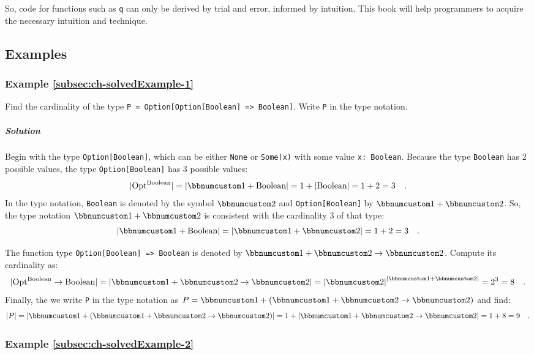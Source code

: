 So, code for functions such as \lstinline!q! can only be derived
by trial and error, informed by intuition. This book will help programmers
to acquire the necessary intuition and technique.

\subsection{Examples}

\subsubsection{Example \label{subsec:ch-solvedExample-1}\ref{subsec:ch-solvedExample-1}}

Find the cardinality of the type \lstinline!P = Option[Option[Boolean] => Boolean]!.
Write \lstinline!P! in the type notation.

\subparagraph{Solution}

Begin with the type \lstinline!Option[Boolean]!, which can be either
\lstinline!None! or \lstinline!Some(x)! with some value \lstinline!x: Boolean!.
Because the type \lstinline!Boolean! has $2$ possible values, the
type \lstinline!Option[Boolean]! has $3$ possible values:
\[
|\text{Opt}^{\text{Boolean}}|=\left|\bbnum 1+\text{Boolean}\right|=1+\left|\text{Boolean}\right|=1+2=3\quad.
\]
In the type notation, \lstinline!Boolean! is denoted by the symbol
$\bbnum 2$ and \lstinline!Option[Boolean]! by $\bbnum 1+\bbnum 2$.
So, the type notation $\bbnum 1+\bbnum 2$ is consistent with the
cardinality $3$ of that type:
\[
\left|\bbnum 1+\text{Boolean}\right|=\left|\bbnum 1+\bbnum 2\right|=1+2=3\quad.
\]

The function type \lstinline!Option[Boolean] => Boolean! is denoted
by $\bbnum 1+\bbnum 2\rightarrow\bbnum 2$. Compute its cardinality
as:
\[
|\text{Opt}^{\text{Boolean}}\rightarrow\text{Boolean}|=\left|\bbnum 1+\bbnum 2\rightarrow\bbnum 2\right|=\left|\bbnum 2\right|^{\left|\bbnum 1+\bbnum 2\right|}=2^{3}=8\quad.
\]
Finally, the we write \lstinline!P! in the type notation as $P=\bbnum 1+\left(\bbnum 1+\bbnum 2\rightarrow\bbnum 2\right)$
and find:
\[
\left|P\right|=\left|\bbnum 1+\left(\bbnum 1+\bbnum 2\rightarrow\bbnum 2\right)\right|=1+\left|\bbnum 1+\bbnum 2\rightarrow\bbnum 2\right|=1+8=9\quad.
\]


\subsubsection{Example \label{subsec:ch-solvedExample-2}\ref{subsec:ch-solvedExample-2}}

